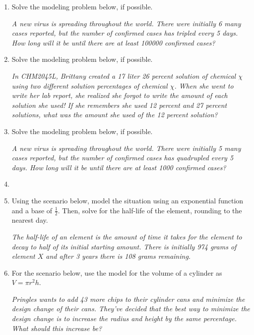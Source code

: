 \documentclass[14pt]{extbook}
\begin{document}
\begin{enumerate}
{\begin{center}
\end{center}
} \newpage
\item{
Solve the modeling problem below, if possible.
\begin{center}
    \textit{ A new virus is spreading throughout the world. There were initially 6 many cases reported, but the number of confirmed cases has tripled every 5 days. How long will it be until there are at least 100000 confirmed cases? }
\end{center}
} \newpage
\item{
Solve the modeling problem below, if possible.
\begin{center}
    \textit{ In CHM2045L, Brittany created a 17 liter 26 percent solution of chemical $\chi$ using two different solution percentages of chemical $\chi$. When she went to write her lab report, she realized she forgot to write the amount of each solution she used! If she remembers she used 12 percent and 27 percent solutions, what was the amount she used of the 12 percent solution? }
\end{center}
} \newpage
\item{
Solve the modeling problem below, if possible.
\begin{center}
    \textit{ A new virus is spreading throughout the world. There were initially 5 many cases reported, but the number of confirmed cases has quadrupled every 5 days. How long will it be until there are at least 1000 confirmed cases? }
\end{center}
} \newpage
\item{
} \newpage
\item{
Using the scenario below, model the situation using an exponential function and a base of $\frac{1}{2}$. Then, solve for the half-life of the element, rounding to the nearest day.
\begin{center}
    \textit{ The half-life of an element is the amount of time it takes for the element to decay to half of its initial starting amount. There is initially 974 grams of element $X$ and after 3 years there is 108 grams remaining. }
\end{center}
} \newpage
\item{
For the scenario below, use the model for the volume of a cylinder as $V = \pi r^2 h$.
\begin{center}
    \textit{ Pringles wants to add 43  more chips to their cylinder cans and minimize the design change of their cans. They've decided that the best way to minimize the design change is to increase the radius and height by the same percentage. What should this increase be? }

\end{center}}
\end{enumerate}
\end{document}

